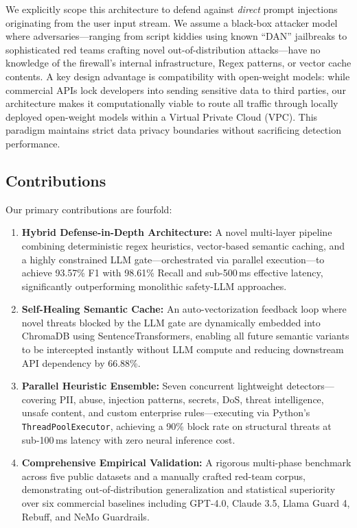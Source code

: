 \documentclass[conference]{IEEEtran}
\begin{document}
We explicitly scope this architecture to defend against \textit{direct}
prompt injections originating from the user input stream. We assume a
black-box attacker model where adversaries---ranging from script
kiddies using known ``DAN'' jailbreaks to sophisticated red teams
crafting novel out-of-distribution attacks---have no knowledge of the
firewall's internal infrastructure, Regex patterns, or vector cache
contents. A key design advantage is compatibility with open-weight
models: while commercial APIs lock developers into sending sensitive
data to third parties, our architecture makes it computationally viable
to route all traffic through locally deployed open-weight models within
a Virtual Private Cloud (VPC). This paradigm maintains strict data privacy
boundaries without sacrificing detection performance.

\subsection{Contributions}

Our primary contributions are fourfold:

\begin{enumerate}
    \item \textbf{Hybrid Defense-in-Depth Architecture:} A novel
    multi-layer pipeline combining deterministic regex heuristics,
    vector-based semantic caching, and a highly constrained LLM
    gate---orchestrated via parallel execution---to achieve 93.57\% F1
    with 98.61\% Recall and sub-500\,ms effective latency, significantly
    outperforming monolithic safety-LLM approaches.

    \item \textbf{Self-Healing Semantic Cache:} An auto-vectorization
    feedback loop where novel threats blocked by the LLM gate are
    dynamically embedded into ChromaDB using SentenceTransformers,
    enabling all future semantic variants to be intercepted instantly
    without LLM compute and reducing downstream API dependency by
    66.88\%.

    \item \textbf{Parallel Heuristic Ensemble:} Seven concurrent
    lightweight detectors---covering PII, abuse, injection patterns,
    secrets, DoS, threat intelligence, unsafe content, and custom
    enterprise rules---executing via Python's
    \texttt{ThreadPoolExecutor}, achieving a 90\% block rate on
    structural threats at sub-100\,ms latency with zero neural
    inference cost.

    \item \textbf{Comprehensive Empirical Validation:} A rigorous
    multi-phase benchmark across five public datasets and a manually
    crafted red-team corpus, demonstrating out-of-distribution
    generalization and statistical superiority over six commercial
    baselines including GPT-4.0, Claude 3.5, Llama Guard 4,
    Rebuff, and NeMo Guardrails.
\end{enumerate}
\end{document}
